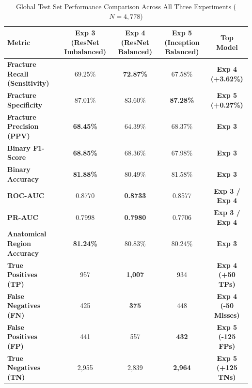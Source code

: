 \documentclass[12pt, a4paper]{report}
\begin{document}
\begin{table}[H]
\centering
\caption{Global Test Set Performance Comparison Across All Three Experiments ($N=4,778$)}
\label{tab:global_metrics}
\begin{tabularx}{\textwidth}{lcccc}
\toprule
\textbf{Metric} & \textbf{Exp 3 (ResNet Imbalanced)} & \textbf{Exp 4 (ResNet Balanced)} & \textbf{Exp 5 (Inception Balanced)} & \textbf{Top Model} \\
\midrule
\textbf{Fracture Recall (Sensitivity)} & 69.25\% & \textbf{72.87\%} & 67.58\% & \textbf{Exp 4 (+3.62\%)} \\
\textbf{Fracture Specificity} & 87.01\% & 83.60\% & \textbf{87.28\%} & \textbf{Exp 5 (+0.27\%)} \\
\textbf{Fracture Precision (PPV)} & \textbf{68.45\%} & 64.39\% & 68.37\% & \textbf{Exp 3} \\
\textbf{Binary F1-Score} & \textbf{68.85\%} & 68.36\% & 67.98\% & \textbf{Exp 3} \\
\textbf{Binary Accuracy} & \textbf{81.88\%} & 80.49\% & 81.58\% & \textbf{Exp 3} \\
\textbf{ROC-AUC} & 0.8770 & \textbf{0.8733} & 0.8577 & \textbf{Exp 3 / Exp 4} \\
\textbf{PR-AUC} & 0.7998 & \textbf{0.7980} & 0.7706 & \textbf{Exp 3 / Exp 4} \\
\textbf{Anatomical Region Accuracy} & \textbf{81.24\%} & 80.83\% & 80.24\% & \textbf{Exp 3} \\
\midrule
\textbf{True Positives (TP)} & 957 & \textbf{1,007} & 934 & \textbf{Exp 4 (+50 TPs)} \\
\textbf{False Negatives (FN)} & 425 & \textbf{375} & 448 & \textbf{Exp 4 (-50 Misses)} \\
\textbf{False Positives (FP)} & 441 & 557 & \textbf{432} & \textbf{Exp 5 (-125 FPs)} \\
\textbf{True Negatives (TN)} & 2,955 & 2,839 & \textbf{2,964} & \textbf{Exp 5 (+125 TNs)} \\
\bottomrule
\end{tabularx}
\end{table}
\end{document}
